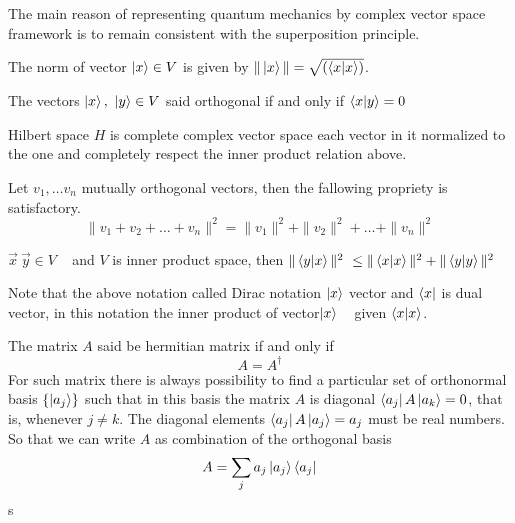 The main reason of representing quantum mechanics by complex  vector space framework is to remain consistent with the superposition principle.
\begin{defn}

The norm of vector $\ket{x} \in V$ is given by $\| \ket{x}\|=\sqrt{\left(\bra{x}\ket{x}\right)}$.
\end{defn}

\begin{defn}[orthogonal]

The vectors $\ket{x},~ \ket{y} \in V$ said orthogonal if and  only if $\bra{x}\ket{y}=0$
\end{defn}

\begin{defn}

Hilbert space $H$ is complete complex vector space  each vector in it normalized to the one and completely  respect the inner product relation above\citep{book:4365}.
\end{defn}

\begin{defn}[Pythagoras]

Let $v_1,\dots v_n$ mutually orthogonal vectors, then the fallowing propriety  is satisfactory.
$$\|v_1+v_2+\dots+v_n\|^2=\| v_1\|^2+\| v_2\|^2+\dots +\| v_n\|^2$$
\end{defn}

\begin{defn}

$\vec{x} ~\vec{y} \in V $ ~ and $V$ is inner product space,
then $\|\bra{y}\ket{x}\|^2~\leq \| \braket{x}{x} \|^2+\|\bra{y} \ket{y} \|^2$
\end{defn}

Note that the above notation called Dirac notation $\ket{x}$ vector and $\bra{x}$ is dual vector, in this notation the inner product of vector$\ket{x}$ ~ given $\bra{x}\ket{x}$.

\begin{defn}

The matrix  $A$ said be  hermitian  matrix if and only if  $$A=A^\dagger$$
 For such matrix there is always possibility to find a particular  set of orthonormal basis  $\{\ket{a_j}\}$ such that in this basis the matrix $A$ is diagonal $\bra{a_j}A\ket{a_k}=0$, that is,   whenever $j\neq k$. The diagonal elements $\bra{a_j}A\ket{a_j}=a_j$ must be real numbers.
So that we can write $A$ as combination of the orthogonal basis
$$A=\sum_j a_j \ket{a_j} \bra{a_j}$$s
\end{defn}

